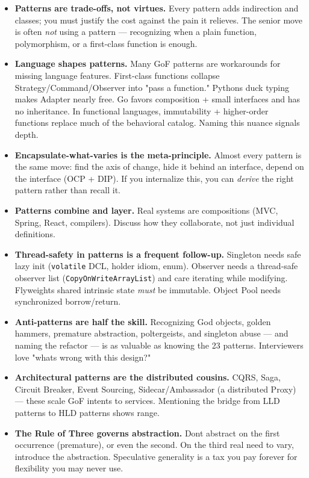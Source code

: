 \documentclass[11pt]{article}
\begin{document}
\begin{itemize}
\item
  \textbf{Patterns are trade-offs, not virtues.} Every pattern adds indirection and classes; you must justify the cost against the pain it relieves. The senior move is often \emph{not} using a pattern --- recognizing when a plain function, polymorphism, or a first-class function is enough.
\item
  \textbf{Language shapes patterns.} Many GoF patterns are workarounds for missing language features. First-class functions collapse Strategy/Command/Observer into "pass a function." Python\textquotesingle s duck typing makes Adapter nearly free. Go favors composition + small interfaces and has no inheritance. In functional languages, immutability + higher-order functions replace much of the behavioral catalog. Naming this nuance signals depth.
\item
  \textbf{Encapsulate-what-varies is the meta-principle.} Almost every pattern is the same move: find the axis of change, hide it behind an interface, depend on the interface (OCP + DIP). If you internalize this, you can \emph{derive} the right pattern rather than recall it.
\item
  \textbf{Patterns combine and layer.} Real systems are compositions (MVC, Spring, React, compilers). Discuss how they collaborate, not just individual definitions.
\item
  \textbf{Thread-safety in patterns is a frequent follow-up.} Singleton needs safe lazy init (\texttt{volatile} DCL, holder idiom, enum). Observer needs a thread-safe observer list (\texttt{CopyOnWriteArrayList}) and care iterating while modifying. Flyweight\textquotesingle s shared intrinsic state \emph{must} be immutable. Object Pool needs synchronized borrow/return.
\item
  \textbf{Anti-patterns are half the skill.} Recognizing God objects, golden hammers, premature abstraction, poltergeists, and singleton abuse --- and naming the refactor --- is as valuable as knowing the 23 patterns. Interviewers love "what\textquotesingle s wrong with this design?"
\item
  \textbf{Architectural patterns are the distributed cousins.} CQRS, Saga, Circuit Breaker, Event Sourcing, Sidecar/Ambassador (a distributed Proxy) --- these scale GoF intents to services. Mentioning the bridge from LLD patterns to HLD patterns shows range.
\item
  \textbf{The Rule of Three governs abstraction.} Don\textquotesingle t abstract on the first occurrence (premature), or even the second. On the third real need to vary, introduce the abstraction. Speculative generality is a tax you pay forever for flexibility you may never use.
\end{itemize}
\end{document}
